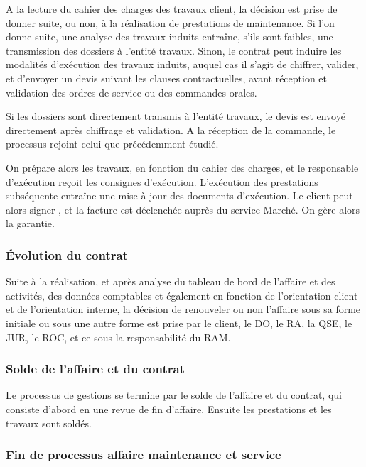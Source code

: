 A la lecture du cahier des charges des travaux client, la décision est prise de donner suite, ou non, à la réalisation de prestations de maintenance. Si l’on donne suite, une analyse des travaux induits entraîne, s’ils sont faibles, une transmission des dossiers à l’entité travaux. Sinon, le contrat peut induire les modalités d’exécution des travaux induits, auquel cas il s’agit de chiffrer, valider, et d’envoyer un devis suivant les clauses contractuelles, avant réception et validation des ordres de service ou des commandes orales.

Si les dossiers sont directement transmis à l’entité travaux, le devis est envoyé directement après chiffrage et validation. A la réception de la commande, le processus rejoint celui que précédemment étudié.

On prépare alors les travaux, en fonction du cahier des charges, et le responsable d’exécution reçoit les consignes d’exécution. L’exécution des prestations subséquente entraîne une mise à jour des documents d’exécution. Le client peut alors signer , et la facture est déclenchée auprès du service Marché. On gère alors la garantie.

\subsubsection{Évolution du contrat}

Suite à la réalisation, et après analyse du tableau de bord de l’affaire et des activités, des données comptables et également en fonction de l’orientation client et de l’orientation interne, la décision de renouveler ou non l’affaire sous sa forme initiale ou sous une autre forme est prise par le client, le DO, le RA, la QSE, le JUR, le ROC, et ce sous la responsabilité du RAM.

\subsubsection{Solde de l’affaire et du contrat}

Le processus de gestions se termine par le solde de l’affaire et du contrat, qui consiste d’abord en une revue de fin d’affaire. Ensuite les prestations et les travaux sont soldés.

\subsubsection{Fin de processus affaire maintenance et service}

